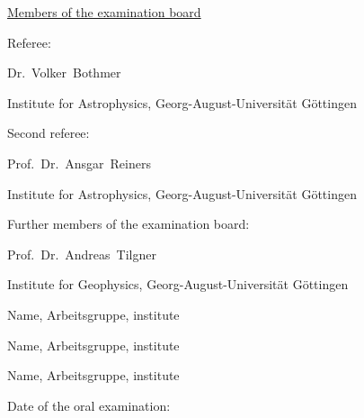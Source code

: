 \noindent \underline{Members of the examination board}
\vspace{\baselineskip}

\noindent Referee:

Dr.~Volker~Bothmer

Institute for Astrophysics, Georg-August-Universität Göttingen
\vspace{\baselineskip}

\noindent Second referee:

Prof.~Dr.~Ansgar~Reiners

Institute for Astrophysics, Georg-August-Universität Göttingen
% 
% 
\vspace{\baselineskip}

\noindent Further members of the examination board:
\vspace{\baselineskip}

Prof.~Dr.~Andreas~Tilgner

Institute for Geophysics, Georg-August-Universität Göttingen
\vspace{\baselineskip}

Name, Arbeitsgruppe, institute
\vspace{\baselineskip}

Name, Arbeitsgruppe, institute
\vspace{\baselineskip}

Name, Arbeitsgruppe, institute
\vspace{3\baselineskip}

\noindent Date of the oral examination: \underline{\hspace{3cm}}


\cleardoublepage


% 
% 
% 
% 

